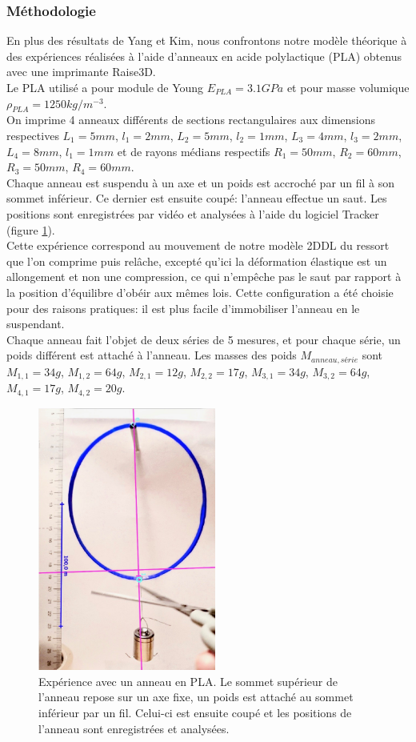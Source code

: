 \subsubsection{Méthodologie}
En plus des résultats de Yang et Kim, nous confrontons notre modèle théorique à des expériences réalisées à l'aide d'anneaux en acide polylactique (PLA) obtenus avec une imprimante Raise3D. \\
Le PLA utilisé a pour module de Young $E_{PLA}=3.1 GPa$ et pour masse volumique $\rho_{PLA}=1250 kg/m^{-3}$. \\
On imprime 4 anneaux différents de sections rectangulaires aux dimensions respectives $L_1=5mm$, $l_1=2mm$, $L_2=5mm$, $l_2=1mm$, $L_3=4mm$, $l_3=2mm$, $L_4=8mm$, $l_1=1mm$ et de rayons médians respectifs $R_1=50mm$, $R_2=60mm$, $R_3=50mm$, $R_4=60mm$. \\
Chaque anneau est suspendu à un axe et un poids est accroché par un fil à son sommet inférieur. Ce dernier est ensuite coupé: l'anneau effectue un saut. Les positions sont enregistrées par vidéo et analysées à l'aide du logiciel Tracker (figure \ref{fig:expsaut}). \\
Cette expérience correspond au mouvement de notre modèle 2DDL du ressort que l'on comprime puis relâche, excepté qu'ici la déformation élastique est un allongement et non une compression, ce qui n'empêche pas le saut par rapport à la position d'équilibre d'obéir aux mêmes lois. Cette configuration a été choisie pour des raisons pratiques: il est plus facile d'immobiliser l'anneau en le suspendant. \\
Chaque anneau fait l'objet de deux séries de 5 mesures, et pour chaque série, un poids différent est attaché à l'anneau. Les masses des poids $M_{anneau,série}$ sont $M_{1,1}=34g$, $M_{1,2}=64g$, $M_{2,1}=12g$, $M_{2,2}=17g$, $M_{3,1}=34g$, $M_{3,2}=64g$, $M_{4,1}=17g$, $M_{4,2}=20g$. \\

\begin{figure}[htb]
\centering
\includegraphics[width=2.3in]{images_2ddl/jumpexp.jpg}
\caption{Expérience avec un anneau en PLA. Le sommet supérieur de l'anneau repose sur un axe fixe, un poids est attaché au sommet inférieur par un fil. Celui-ci est ensuite coupé et les positions de l'anneau sont enregistrées et analysées.}
\label{fig:expsaut}
\end{figure}


